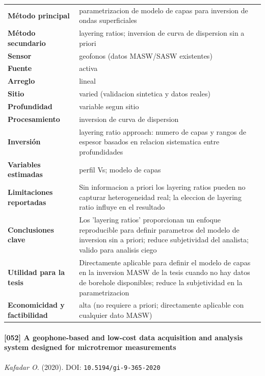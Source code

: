 \begin{center}\scriptsize
\begin{tabularx}{\textwidth}{@{}>{\bfseries}p{3.3cm} X@{}}
\toprule
M\'etodo principal & parametrizacion de modelo de capas para inversion de ondas superficiales \\
M\'etodo secundario & layering ratios; inversion de curva de dispersion sin a priori \\
Sensor & geofonos (datos MASW/SASW existentes) \\
Fuente & activa \\
Arreglo & lineal \\
Sitio & varied (validacion sintetica y datos reales) \\
Profundidad & variable segun sitio \\
Procesamiento & inversion de curva de dispersion \\
Inversi\'on & layering ratio approach: numero de capas y rangos de espesor basados en relacion sistematica entre profundidades \\
Variables estimadas & perfil Vs; modelo de capas \\
Limitaciones reportadas & Sin informacion a priori los layering ratios pueden no capturar heterogeneidad real; la eleccion de layering ratio influye en el resultado \\
Conclusiones clave & Los 'layering ratios' proporcionan un enfoque reproducible para definir parametros del modelo de inversion sin a priori; reduce subjetividad del analista; valido para analisis ciego \\
Utilidad para la tesis & Directamente aplicable para definir el modelo de capas en la inversion MASW de la tesis cuando no hay datos de borehole disponibles; reduce la subjetividad en la parametrizacion \\
Economicidad y factibilidad & alta (no requiere a priori; directamente aplicable con cualquier dato MASW) \\
\bottomrule
\end{tabularx}
\end{center}

\paragraph{[052] A geophone-based and low-cost data acquisition and analysis system designed for microtremor measurements} \emph{Kafadar O.} (2020).
{\scriptsize DOI: \texttt{10.5194/gi-9-365-2020}}

